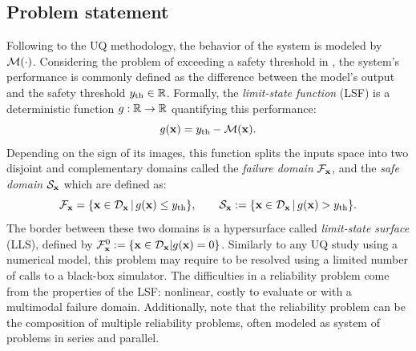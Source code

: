 \subsection{Problem statement}

Following to the UQ methodology, the behavior of the system is modeled by $\mathcal{M}(\cdot)$. 
Considering the problem of exceeding a safety threshold in , the system's performance is commonly defined as the difference between the model's output and the safety threshold $y_\mathrm{th}\in\mathbb{R}$. 
Formally, the \textit{limit-state function} (LSF) is a deterministic function $g:\mathbb{R}\rightarrow\mathbb{R}$ quantifying this performance: 
\begin{equation}
    g({\bf x}) = y_\mathrm{th} - \mathcal{M}({\bf x}).
\end{equation}
Depending on the sign of its images, this function splits the inputs space into two disjoint and complementary domains called  
the \textit{failure domain} $\mathcal{F}_{{\bf x}}$, and the \textit{safe domain} $\mathcal{S}_{\bf x}$ which are defined as:
\begin{equation}
    \mathcal{F}_{{\bf x}} = \{{\bf x} \in \mathcal{D}_{\bf x} \, | \,  g({\bf x}) \leq y_\mathrm{th}\}, \qquad 
    \mathcal{S}_{\bf x} := \{{\bf x} \in \mathcal{D}_{\bf x} \, | \, g({\bf x}) > y_\mathrm{th}\}. 
\end{equation}
The border between these two domains is a hypersurface called \textit{limit-state surface} (LLS), defined by $\mathcal{F}_{{\bf x}}^0 := \{{\bf x} \in \mathcal{D}_{\bf x} | g({\bf x}) = 0\}$. 
Similarly to any UQ study using a numerical model, this problem may require to be resolved using a limited number of calls to a black-box simulator. 
The difficulties in a reliability problem come from the properties of the LSF: nonlinear, costly to evaluate or with a multimodal failure domain. 
Additionally, note that the reliability problem can be the composition of multiple reliability problems, often modeled as system of problems in series and parallel.

